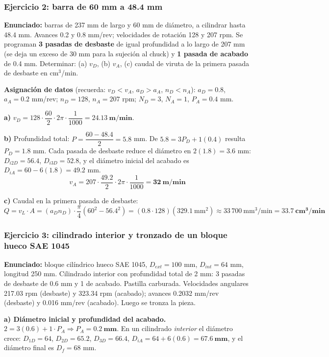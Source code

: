\documentclass[12pt,a4paper]{article}
\begin{document}
\subsubsection*{Ejercicio 2: barra de 60 mm a 48.4 mm}
\textbf{Enunciado:} barras de 237 mm de largo y 60 mm de diámetro, a cilindrar
hasta 48.4 mm. Avances 0.2 y 0.8 mm/rev; velocidades de rotación 128 y 207 rpm.
Se programan \textbf{3 pasadas de desbaste} de igual profundidad a lo largo de
207 mm (se deja un exceso de 30 mm para la sujeción al chuck) y \textbf{1 pasada
	de acabado} de 0.4 mm. Determinar: (a) $v_D$, (b) $v_A$, (c) caudal de viruta
de
la primera pasada de desbaste en cm$^3$/min.

\textbf{Asignación de datos} (recuerda: $v_D<v_A$, $a_D>a_A$, $n_D<n_A$): $a_D =
	0.8$, $a_A = 0.2$ mm/rev; $n_D = 128$, $n_A = 207$ rpm; $N_D = 3$, $N_A = 1$,
$P_A = 0.4$ mm.

\textbf{a)} $v_D = 128\cdot\dfrac{60}{2}\cdot 2\pi\cdot\dfrac{1}{1000} =
	\mathbf{24.13\ m/min}$.

\textbf{b)} Profundidad total: $P = \dfrac{60 - 48.4}{2} = 5.8$ mm. De $5.8 =
	3P_D + 1(0.4)$ resulta $P_D = 1.8$ mm. Cada pasada de desbaste reduce el
diámetro en $2(1.8) = 3.6$ mm: $D_{i2D} = 56.4$, $D_{i3D} = 52.8$, y el diámetro
inicial del acabado es $D_{iA} = 60 - 6(1.8) = 49.2$ mm.
\[ v_A = 207\cdot\frac{49.2}{2}\cdot 2\pi\cdot\frac{1}{1000} = \mathbf{32\
		m/min} \]

\textbf{c)} Caudal en la primera pasada de desbaste:
\[ Q = v_L\cdot A = (a_D n_D)\cdot\frac{\pi}{4}(60^2 - 56.4^2) = (0.8\cdot
	128)(329.1\ \text{mm}^2) \approx 33\,700\ \text{mm}^3/\text{min} =
	\mathbf{33.7\
		cm^3/min} \]

\subsubsection*{Ejercicio 3: cilindrado interior y tronzado de un bloque hueco
	SAE 1045}
\textbf{Enunciado:} bloque cilíndrico hueco SAE 1045, $D_{ext} = 100$ mm,
$D_{int} = 64$ mm, longitud 250 mm. Cilindrado interior con profundidad total de
2 mm: 3 pasadas de desbaste de 0.6 mm y 1 de acabado. Pastilla carburada.
Velocidades angulares 217.03 rpm (desbaste) y 323.34 rpm (acabado); avances
0.2032 mm/rev (desbaste) y 0.016 mm/rev (acabado). Luego se tronza la pieza.

\textbf{a) Diámetro inicial y profundidad del acabado.} $2 = 3(0.6) + 1\cdot P_A
	\Rightarrow P_A = \mathbf{0.2\ mm}$. En un cilindrado \emph{interior} el
diámetro crece: $D_{1D} = 64$, $D_{2D} = 65.2$, $D_{3D} = 66.4$, $D_{iA} = 64 +
	6(0.6) = \mathbf{67.6\ mm}$, y el diámetro final es $D_f = 68$ mm.
\end{document}
